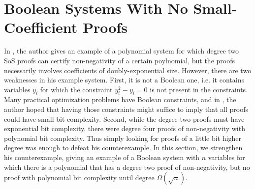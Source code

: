\section{Boolean Systems With No Small-Coefficient Proofs}\label{sec:counterexample}
In \cite{odonnell17}, the author gives an example of a polynomial system for which degree two SoS proofs can certify non-negativity of a certain poylnomial, but the proofs necessarily involves coefficients of doubly-exponential size. However, there are two weaknesses in his example system. First, it is not a Boolean one, i.e. it contains variables $y_i$ for which the constraint $y_i^2 - y_i = 0$ is not present in the constraints. Many practical optimization problems have Boolean constraints, and in \cite{odonnell17}, the author hoped that having those constraints might suffice to imply that all proofs could have small bit complexity. Second, while the degree two proofs must have exponential bit complexity, there were degree four proofs of non-negativity with polynomial bit complexity. Thus simply looking for proofs of a little bit higher degree was enough to defeat his counterexample. In this section, we strengthen his counterexample, giving an example of a Boolean system with $n$ variables for which there is a polynomial that has a degree two proof of non-negativity, but no proof with polynomial bit complexity until degree $\Omega(\sqrt{n})$.

